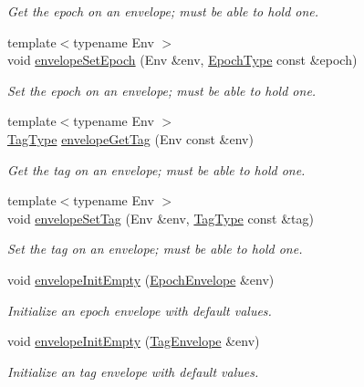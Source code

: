 \begin{DoxyCompactItemize}
\begin{DoxyCompactList}\small\item\em Get the epoch on an envelope; must be able to hold one. \end{DoxyCompactList}\item 
{\footnotesize template$<$typename Env $>$ }\\void \hyperlink{namespacevt_a4a0a9928690206b588dbcac2afb71088}{envelope\+Set\+Epoch} (Env \&env, \hyperlink{namespacevt_a81d11b28122d43bf9834577e4a06440f}{Epoch\+Type} const \&epoch)
\begin{DoxyCompactList}\small\item\em Set the epoch on an envelope; must be able to hold one. \end{DoxyCompactList}\item 
{\footnotesize template$<$typename Env $>$ }\\\hyperlink{namespacevt_a84ab281dae04a52a4b243d6bf62d0e52}{Tag\+Type} \hyperlink{namespacevt_af16ad10e40d8a2f2c1128068774c1bc4}{envelope\+Get\+Tag} (Env const \&env)
\begin{DoxyCompactList}\small\item\em Get the tag on an envelope; must be able to hold one. \end{DoxyCompactList}\item 
{\footnotesize template$<$typename Env $>$ }\\void \hyperlink{namespacevt_a0eb7eef640bbf48bff94e6683be7a3dd}{envelope\+Set\+Tag} (Env \&env, \hyperlink{namespacevt_a84ab281dae04a52a4b243d6bf62d0e52}{Tag\+Type} const \&tag)
\begin{DoxyCompactList}\small\item\em Set the tag on an envelope; must be able to hold one. \end{DoxyCompactList}\item 
void \hyperlink{namespacevt_ae56472f58b6582abacae687ead397380}{envelope\+Init\+Empty} (\hyperlink{namespacevt_af71a025689a3da5037785b53a7a8e78c}{Epoch\+Envelope} \&env)
\begin{DoxyCompactList}\small\item\em Initialize an epoch envelope with default values. \end{DoxyCompactList}\item 
void \hyperlink{namespacevt_a2c8d0d4109460ccb89316ca4b3cc3aea}{envelope\+Init\+Empty} (\hyperlink{namespacevt_a7b951ab92dca9319e12e3fc406ccb309}{Tag\+Envelope} \&env)
\begin{DoxyCompactList}\small\item\em Initialize an tag envelope with default values. \end{DoxyCompactList}\item 

\end{DoxyCompactItemize}
